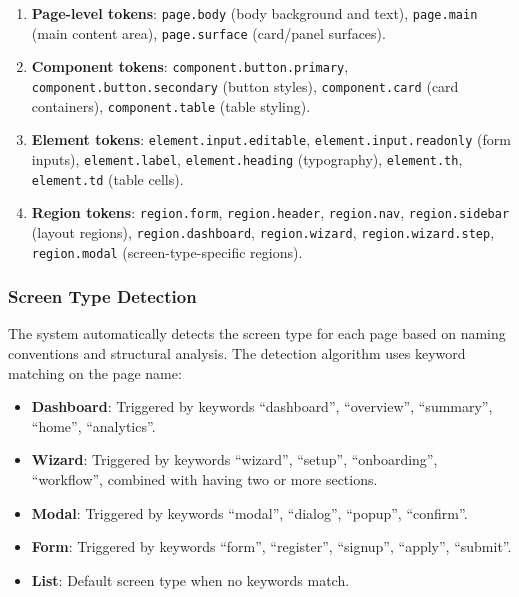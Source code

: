 \begin{enumerate}
    \item \textbf{Page-level tokens}: \texttt{page.body} (body background and text), \texttt{page.main} (main content area), \texttt{page.surface} (card/panel surfaces).
    
    \item \textbf{Component tokens}: \texttt{component.button.primary}, \texttt{component.button.secondary} (button styles), \texttt{component.card} (card containers), \texttt{component.table} (table styling).
    
    \item \textbf{Element tokens}: \texttt{element.input.editable}, \texttt{element.input.readonly} (form inputs), \texttt{element.label}, \texttt{element.heading} (typography), \texttt{element.th}, \texttt{element.td} (table cells).
    
    \item \textbf{Region tokens}: \texttt{region.form}, \texttt{region.header}, \texttt{region.nav}, \texttt{region.sidebar} (layout regions), \texttt{region.dashboard}, \texttt{region.wizard}, \texttt{region.wizard.step}, \texttt{region.modal} (screen-type-specific regions).
\end{enumerate}


\subsubsection{Screen Type Detection}

The system automatically detects the screen type for each page based on naming conventions and structural analysis. The detection algorithm uses keyword matching on the page name:

\begin{itemize}
    \item \textbf{Dashboard}: Triggered by keywords ``dashboard'', ``overview'', ``summary'', ``home'', ``analytics''.
    \item \textbf{Wizard}: Triggered by keywords ``wizard'', ``setup'', ``onboarding'', ``workflow'', combined with having two or more sections.
    \item \textbf{Modal}: Triggered by keywords ``modal'', ``dialog'', ``popup'', ``confirm''.
    \item \textbf{Form}: Triggered by keywords ``form'', ``register'', ``signup'', ``apply'', ``submit''.
    \item \textbf{List}: Default screen type when no keywords match.
\end{itemize}

